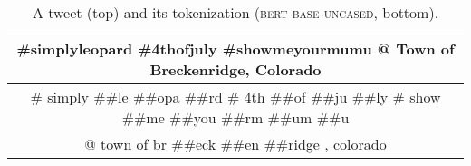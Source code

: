 \begin{table*}
    \centering
    \small
    \begin{tabular}{c} \toprule
        \#simplyleopard \#4thofjuly \#showmeyourmumu @ Town of Breckenridge, Colorado \\ \midrule
        \# simply \#\#le \#\#opa \#\#rd \# 4th \#\#of \#\#ju \#\#ly \# show \#\#me \#\#you \#\#rm \#\#um \#\#u \\
        @ town of br \#\#eck \#\#en \#\#ridge , colorado \\
        \bottomrule
    \end{tabular}
    \caption{A tweet (top) and its \wpc{} tokenization  (\textsc{bert-base-uncased}, bottom).} %
    \label{tab:example}
\end{table*}
